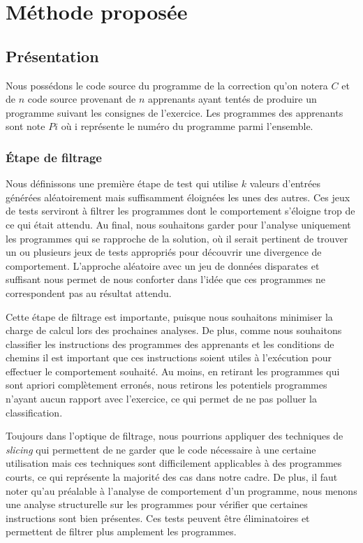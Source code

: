 \section{Méthode proposée}

\subsection{Présentation}
Nous possédons le code source du programme de la correction qu'on notera $C$ et de $n$ code source provenant de $n$ apprenants ayant tentés de produire un programme suivant les consignes de l'exercice. Les programmes des apprenants sont note $Pi$ où i représente le numéro du programme parmi l'ensemble.

\subsubsection*{Étape de filtrage}
Nous définissons une première étape de test qui utilise $k$ valeurs d'entrées générées aléatoirement mais suffisamment éloignées les unes des autres. Ces jeux de tests serviront à filtrer les programmes dont le comportement s'éloigne trop de ce qui était attendu. 
Au final, nous souhaitons garder pour l'analyse uniquement les programmes qui se rapproche de la solution, où il serait pertinent de trouver un ou plusieurs jeux de tests appropriés pour découvrir une divergence de comportement. 
L'approche aléatoire avec un jeu de données disparates et suffisant nous permet de nous conforter dans l'idée que ces programmes ne correspondent pas au résultat attendu.

Cette étape de filtrage est importante, puisque nous souhaitons minimiser la charge de calcul lors des prochaines analyses. De plus, comme nous souhaitons classifier les instructions des programmes des apprenants et les conditions de chemins il est important que ces instructions soient utiles à l'exécution pour effectuer le comportement souhaité. Au moins, en retirant les programmes qui sont apriori complètement erronés, nous retirons les potentiels programmes n'ayant aucun rapport avec l'exercice, ce qui permet de ne pas polluer la classification.

Toujours dans l'optique de filtrage, nous pourrions appliquer des techniques de \textit{slicing} qui permettent de ne garder que le code nécessaire à une certaine utilisation mais ces techniques sont difficilement applicables à des programmes courts, ce qui représente la majorité des cas dans notre cadre. 
De plus, il faut noter qu'au préalable à l'analyse de comportement d'un programme, nous menons une analyse structurelle sur les programmes pour vérifier que certaines instructions sont bien présentes. Ces tests peuvent être éliminatoires et permettent de filtrer plus amplement les programmes.

